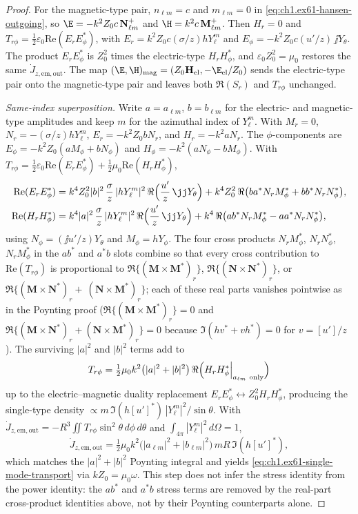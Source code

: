 \begin{proof}
For the magnetic-type pair, $n_{\ell m}=c$ and $m_{\ell m}=0$ in \eqref{eq:ch1.ex61-hansen-outgoing}, so $\E=-k^2 Z_0 c\,\mathbf N_{\ell m}^+$ and $\H=k^2 c\,\mathbf M_{\ell m}^+$. Then $H_r=0$ and $T_{r\phi}=\tfrac12\varepsilon_0\mathrm{Re}(E_r E_\phi^*)$, with $E_r=k^2 Z_0 c(\sigma/z)h Y_\ell^m$ and $E_\phi=-k^2 Z_0 c(u'/z)\,\jj Y_\theta$. The product $E_r E_\phi^*$ is $Z_0^2$ times the electric-type $H_r H_\phi^*$, and $\varepsilon_0 Z_0^2=\mu_0$ restores the same $\dot J_{z,\mathrm{em,out}}$. The map $(\E,\H)_{\mathrm{mag}}=(Z_0\mathbf H_{\mathrm{el}},-\E_{\mathrm{el}}/Z_0)$ sends the electric-type pair onto the magnetic-type pair and leaves both $\Re(S_r)$ and $T_{r\phi}$ unchanged.

\medskip\noindent\emph{Same-index superposition.}
Write $a=a_{\ell m}$, $b=b_{\ell m}$ for the electric- and magnetic-type amplitudes and keep $m$ for the azimuthal index of $Y_\ell^m$. With $M_r=0$, $N_r=-(\sigma/z)hY_\ell^m$, $E_r=-k^2 Z_0 b N_r$, and $H_r=-k^2 a N_r$. The $\phi$-components are $E_\phi=-k^2 Z_0(a M_\phi+b N_\phi)$ and $H_\phi=-k^2(a N_\phi-b M_\phi)$. With $T_{r\phi}=\tfrac12\varepsilon_0\mathrm{Re}(E_r E_\phi^*)+\tfrac12\mu_0\mathrm{Re}(H_r H_\phi^*)$,
\begin{align*}
\mathrm{Re}(E_r E_\phi^*)
&=k^4 Z_0^2|b|^2\,\frac{\sigma}{z}\,|h Y_\ell^m|^2\,\Re\Bigl(\frac{u'}{z}\,\jj Y_\theta\Bigr)
+k^4 Z_0^2\,\Re\bigl(b a^* N_r M_\phi^*+b b^* N_r N_\phi^*\bigr),\\
\mathrm{Re}(H_r H_\phi^*)
&=k^4|a|^2\,\frac{\sigma}{z}\,|h Y_\ell^m|^2\,\Re\Bigl(\frac{u'}{z}\,\jj Y_\theta\Bigr)
+k^4\,\Re\bigl(a b^* N_r M_\phi^*-a a^* N_r N_\phi^*\bigr),
\end{align*}
using $N_\phi=(\jj u'/z)Y_\theta$ and $M_\phi=hY_\phi$. The four cross products $N_r M_\phi^*$, $N_r N_\phi^*$, $N_r M_\phi^*$ in the $ab^*$ and $a^*b$ slots combine so that every cross contribution to $\mathrm{Re}(T_{r\phi})$ is proportional to $\Re\{(\mathbf M\times\mathbf M^*)_r\}$, $\Re\{(\mathbf N\times\mathbf N^*)_r\}$, or $\Re\{(\mathbf M\times\mathbf N^*)_r+\ (\mathbf N\times\mathbf M^*)_r\}$; each of these real parts vanishes pointwise as in the Poynting proof ($\Re\{(\mathbf M\times\mathbf M^*)_r\}=0$ and $\Re\{(\mathbf M\times\mathbf N^*)_r+(\mathbf N\times\mathbf M^*)_r\}=0$ because $\Im(h v^*+v h^*)=0$ for $v=[u']/z$). The surviving $|a|^2$ and $|b|^2$ terms add to
\[
T_{r\phi}=\tfrac12\mu_0 k^2\bigl(|a|^2+|b|^2\bigr)\,\Re\Bigl(H_r H_\phi^*\Big|_{a_{\ell m}\ \text{only}}\Bigr)
\]
up to the electric--magnetic duality replacement $E_r E_\phi^*\leftrightarrow Z_0^2 H_r H_\phi^*$, producing the single-type density $\propto m\,\Im(h[u']^*)\,|Y_\ell^m|^2/\sin\theta$. With $\dot J_{z,\mathrm{em,out}}=-R^3\iint T_{r\phi}\sin^2\theta\,d\phi\,d\theta$ and $\int_{4\pi}|Y_\ell^m|^2\,d\Omega=1$,
\[
\dot J_{z,\mathrm{em,out}}=\tfrac12\mu_0 k^2\bigl(|a_{\ell m}|^2+|b_{\ell m}|^2\bigr)\,m R\,\Im(h[u']^*),
\]
which matches the $|a|^2+|b|^2$ Poynting integral and yields \eqref{eq:ch1.ex61-single-mode-transport} via $kZ_0=\mu_0\omega$. This step does not infer the stress identity from the power identity: the $ab^*$ and $a^*b$ stress terms are removed by the real-part cross-product identities above, not by their Poynting counterparts alone.
\end{proof}


